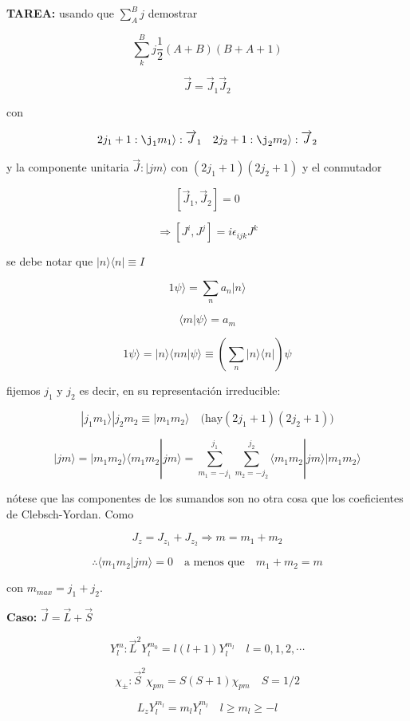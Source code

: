 \documentclass{report}
\begin{document}
\textbf{TAREA:} usando que $\sum_{A}^{B} j$ demostrar

\[\sum_{k}^{B} j \frac{1}{2} (A+B)(B+A+1)\]

\[\overrightarrow{J} = \overrightarrow{J}_1 \overrightarrow{J}_2\]

con

\[2j_1 +1 : \j_1 m_1 \rangle : \overrightarrow{J}_1 \quad 2j_2 +1 : \j_2 m_2 \rangle : \overrightarrow{J}_2 \]

y la componente unitaria $\overrightarrow{J} : |jm \rangle $ con $(2j_1 +1)(2j_2 +1)$ y el conmutador

\[[\overrightarrow{J}_1 , \overrightarrow{J}_2] = 0\]

\[\Rightarrow [J^i , J^j ] = i \epsilon_{ijk} J^k \]

se debe notar que $|n \rangle \langle n| \equiv I$

\[1 \psi \rangle = \sum_{n} a_{n}|n\rangle\]

\[\langle m | \psi \rangle = a_{m}\]

\[1 \psi \rangle = |n \rangle \langle n n| \psi \rangle \equiv (\sum_{n} |n \rangle \langle n|) \psi\]

fijemos $j_1 $ y $j_2 $ es decir, en su representación irreducible:

\[|j_1 m_1 \rangle | j_2 m_2 \equiv |m_1 m_2 \rangle \quad \text{(hay} (2j_1 +1) (2 j_2 +1))\]

\[|jm \rangle = |m_1 m_2 \rangle \langle m_1 m_2 | j m \rangle = \sum_{m_1 = -j_1 }^{j_1 } \sum_{m_2 = -j_2}^{j_2 } \langle m_1 m_2 | jm \rangle |m_1 m_2 \rangle\]

nótese que las componentes de los sumandos son no otra cosa que los coeficientes de Clebsch-Yordan. Como

\[J_z = J_{z_{1}} + J_{z_{2}} \Rightarrow m = m_1 + m_2\]

\[\therefore \langle m_1 m_2 | jm \rangle = 0 \quad \text{a menos que} \quad m_1 + m_2 = m\]

con $m_{max} = j_1 + j_2$.

\textbf{Caso:} $\overrightarrow{J} = \overrightarrow{L} + \overrightarrow{S}$

\[Y_{l}^{m} : \overrightarrow{L}^2 Y_{l}^{m_{0} } = l (l+1) Y_{l}^{m_{l}} \quad l = 0,1,2,\cdots\]

\[\chi _{\pm} : \overrightarrow{S}^2 \chi_{pm} = S(S+1) \chi_{pm} \quad S=1/2\]

\[L_z Y_{l}^{m_{l}} = m_{l} Y_{l}^{m_{l}} \quad l \geqslant m_{l} \geqslant -l\]
\end{document}
